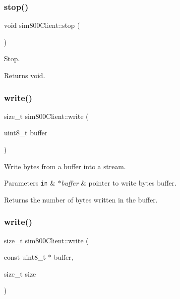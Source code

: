 \subsubsection{\texorpdfstring{stop()}{stop()}}
{\footnotesize\ttfamily void sim800\+Client\+::stop (\begin{DoxyParamCaption}{ }\end{DoxyParamCaption})}



Stop. 

\begin{DoxyReturn}{Returns}
void. 
\end{DoxyReturn}
\mbox{\label{classsim800Client_ab730edb73267508cbc261b13e643b12d}} 
\subsubsection{\texorpdfstring{write()}{write()}\hspace{0.1cm}{\footnotesize\ttfamily [1/2]}}
{\footnotesize\ttfamily size\+\_\+t sim800\+Client\+::write (\begin{DoxyParamCaption}\item[{uint8\+\_\+t}]{buffer }\end{DoxyParamCaption})}



Write bytes from a buffer into a stream. 


\begin{DoxyParams}[1]{Parameters}
\mbox{\tt in}  & {\em $\ast$buffer} & pointer to write bytes buffer. \\
\hline
\end{DoxyParams}
\begin{DoxyReturn}{Returns}
the number of bytes written in the buffer. 
\end{DoxyReturn}
\mbox{\label{classsim800Client_aef786fd9fa179f04b016c7cb916a7f39}} 
\subsubsection{\texorpdfstring{write()}{write()}\hspace{0.1cm}{\footnotesize\ttfamily [2/2]}}
{\footnotesize\ttfamily size\+\_\+t sim800\+Client\+::write (\begin{DoxyParamCaption}\item[{const uint8\+\_\+t $\ast$}]{buffer,  }\item[{size\+\_\+t}]{size }\end{DoxyParamCaption})}



